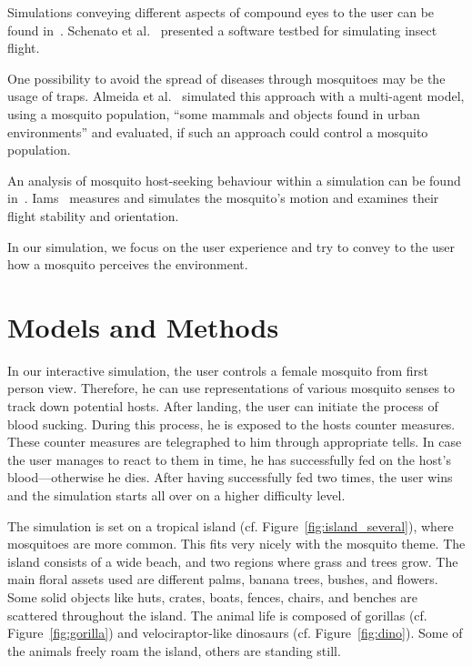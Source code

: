 \documentclass{sig-alternate-05-2015}
\begin{document}
Simulations conveying different aspects of compound eyes to the user can be found in~\cite{giger, vorobyev1996, williams2007}.
Schenato et al.~\cite{schenato2001} presented a software testbed for simulating insect flight.

One possibility to avoid the spread of diseases through mosquitoes may be the usage of traps. Almeida et al.~\cite{almeida2010} simulated this approach with a multi-agent model, using a mosquito population, ``some mammals and objects found in urban environments'' and evaluated, if such an approach could control a mosquito population. 

An analysis of mosquito host-seeking behaviour within a simulation can be found in~\cite{iams2014}. Iams~\cite{cummins2012} measures and simulates the mosquito's motion and examines their flight stability and orientation.

In our simulation, we focus on the user experience and try to convey to the user how a mosquito perceives the environment.


\section{Models and Methods}
\label{sec:models}
In our interactive simulation, the user controls a female mosquito from first person view. Therefore, he can use representations of various mosquito senses to track down potential hosts. After landing, the user can initiate the process of blood sucking. During this process, he is exposed to the hosts counter measures. These counter measures are telegraphed to him through appropriate tells. In case the user manages to react to them in time, he has successfully fed on the host's blood---otherwise he dies. After having successfully fed two times, the user wins and the simulation starts all over on a higher difficulty level.


The simulation is set on a tropical island (cf. Figure~\ref{fig:island_several}), where mosquitoes are more common. This fits very nicely with the mosquito theme. The island consists of a wide beach, and two regions where grass and trees grow. The main floral assets used are different palms, banana trees, bushes, and flowers. Some solid objects like huts, crates, boats, fences, chairs, and benches are scattered throughout the island. The animal life is composed of gorillas (cf. Figure~\ref{fig:gorilla}) and velociraptor-like dinosaurs (cf. Figure~\ref{fig:dino}). Some of the animals freely roam the island, others are standing still.
\end{document}
